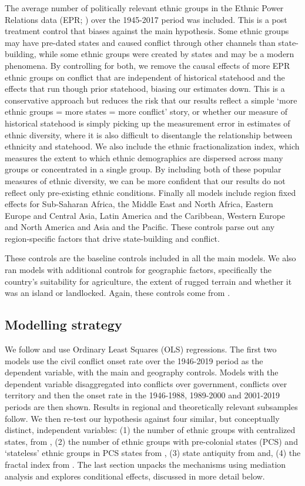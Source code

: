The average number of politically relevant ethnic groups in the Ethnic Power
Relations data (EPR; \citet{Vogt2015}) over the 1945-2017 period was included.
This is a post treatment control that biases against the main hypothesis. Some
ethnic groups may have pre-dated states and caused conflict through other
channels than state-building, while some ethnic groups were created by states
and may be a modern phenomena. By controlling for both, we remove the causal
effects of more EPR ethnic groups on conflict that are independent of historical
statehood and the effects that run though prior statehood, biasing our estimates
down. This is a conservative approach but reduces the risk that our results
reflect a simple `more ethnic groups = more states = more conflict' story, or
whether our measure of historical statehood is simply picking up the measurement
error in estimates of ethnic diversity, where it is also difficult to
disentangle the relationship between ethnicity and statehood. We also include
the ethnic fractionalization index, which measures the extent to which ethnic
demographics are dispersed across many groups or concentrated in a single group.
By including both of these popular measures of ethnic diversity, we can be more
confident that our results do not reflect only pre-existing ethnic conditions.
Finally all models include region fixed effects for Sub-Saharan Africa, the
Middle East and North Africa, Eastern Europe and Central Asia, Latin America and
the Caribbean, Western Europe and North America and Asia and the Pacific. These
controls parse out any region-specific factors that drive state-building and
conflict.  

These controls are the baseline controls included in all the main models. We
also ran models with additional controls for geographic factors, specifically
the country's suitability for agriculture, the extent of rugged terrain and
whether it was an island or landlocked. Again, these controls come from
\citet{Dincecco2019}. 

\subsection{Modelling strategy}

We follow \citet{Besley2014} and use Ordinary Least Squares (OLS) regressions.
The first two models use the civil conflict onset rate over the 1946-2019
period as the dependent variable, with the main and geography
controls. Models with the dependent variable disaggregated into conflicts over
government, conflicts over territory and then the onset rate in the
1946-1988, 1989-2000 and 2001-2019 periods are then shown. Results in regional
and theoretically relevant subsamples follow. We then re-test our hypothesis
against four similar, but conceptually distinct, independent variables: (1) the
number of ethnic groups with centralized states, from \citet{Wig2016}, (2) the
number of ethnic groups with pre-colonial states (PCS) and `stateless' ethnic
groups in PCS states from \citet{Paine2019}, (3) state antiquity from
\citet{Bockstette2012} and, (4) the fractal index from \citet{Alesina2011}. The
last section unpacks the mechanisms using mediation analysis and explores conditional effects, discussed in more
detail below. 

